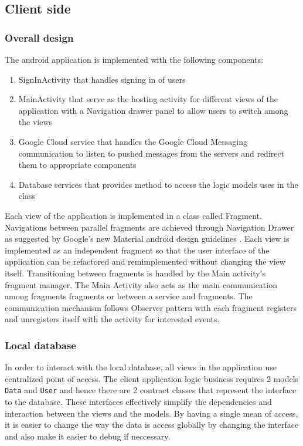 \subsection{Client side}

\subsubsection{Overall design}
The android application is implemented with the following components:
\begin{enumerate}
    \item SignInActivity that handles signing in of users
    \item MainActivity that serve as the hosting activity for different views of the application with a Navigation
        drawer panel to allow users to switch among the views
    \item Google Cloud service that handles the Google Cloud Messaging communication to listen to pushed messages from
        the servers and redirect them to appropriate components
    \item Database services that provides method to access the logic models uses in the class
\end{enumerate}

Each view of the application is implemented in a class called Fragment.  Navigations between parallel fragments are
achieved through Navigation Drawer as suggested by Google's new Material android design guidelines
\cite{NavigationDrawerPattern}. Each view is implemented as an independent fragment so that the user interface of the
application can be refactored and remimplemented without changing the view itself.  Transitioning between fragments is
handled by the Main activity's fragment manager. The Main Activity also acts as the main communication among fragments
fragments or between a service and fragments. The communication mechanism follows Observer pattern
\cite{Gamma:1995:DPE:186897} with each fragment registers and unregisters itself with the activity for interested
events.

\subsubsection{Local database}
In order to interact with the local database, all views in the application use centralized point of access. The client
application logic business requires 2 models \texttt{Data} and \texttt{User} and hence there are 2 contract classes that
represent the interface to the database. These interfaces effectively simplify the dependencies and interaction between
the views and the models. By having a single mean of access, it is easier to change the way the data is access globally
by changing the interface and also make it easier to debug if neccessary.

